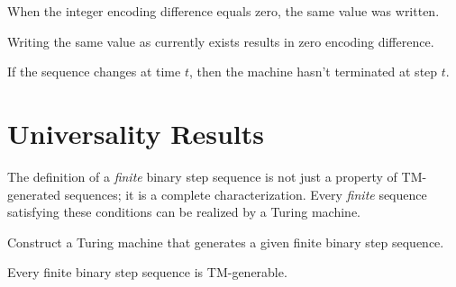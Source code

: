 \begin{lemma}
\label{lem:encode_diff_zero_implies_same}
\notready
{}
When the integer encoding difference equals zero, the same value was written.
\end{lemma}

\begin{lemma}
\label{lem:encode_same_value_zero_diff}
\notready
{}
Writing the same value as currently exists results in zero encoding difference.
\end{lemma}

\begin{lemma}
\label{lem:sequence_change_implies_not_terminal}
\notready
{}
If the sequence changes at time $t$, then the machine hasn't terminated at step $t$.
\end{lemma}

\chapter{Universality Results}

The definition of a \emph{finite} binary step sequence is not just a property of TM-generated sequences; it is a complete characterization. Every \emph{finite} sequence satisfying these conditions can be realized by a Turing machine.

\begin{definition}
\label{def:construct_tm}
\notready
{}
Construct a Turing machine that generates a given finite binary step sequence.
\end{definition}

\begin{theorem}
\label{thm:finite_sequence_generation}
\notready
{}
Every finite binary step sequence is TM-generable.
\end{theorem}

